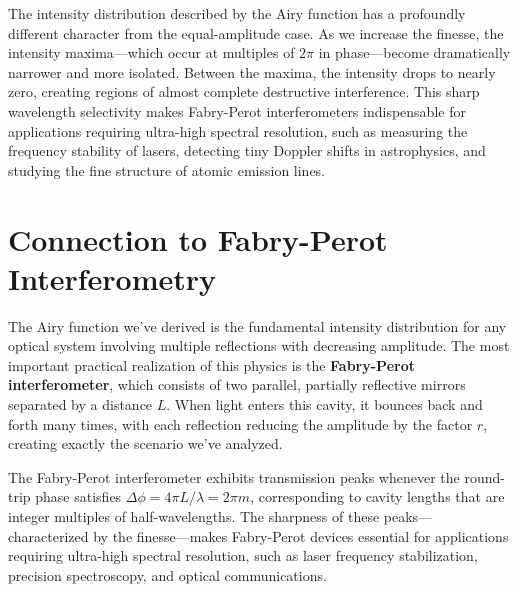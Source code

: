 \documentclass[
  a4paper,
]{book}
\begin{document}
The intensity distribution described by the Airy function has a
profoundly different character from the equal-amplitude case. As we
increase the finesse, the intensity maxima---which occur at multiples of
\(2\pi\) in phase---become dramatically narrower and more isolated.
Between the maxima, the intensity drops to nearly zero, creating regions
of almost complete destructive interference. This sharp wavelength
selectivity makes Fabry-Perot interferometers indispensable for
applications requiring ultra-high spectral resolution, such as measuring
the frequency stability of lasers, detecting tiny Doppler shifts in
astrophysics, and studying the fine structure of atomic emission lines.

\section{Connection to Fabry-Perot
Interferometry}\label{connection-to-fabry-perot-interferometry}

The Airy function we've derived is the fundamental intensity
distribution for any optical system involving multiple reflections with
decreasing amplitude. The most important practical realization of this
physics is the \textbf{Fabry-Perot interferometer}, which consists of
two parallel, partially reflective mirrors separated by a distance
\(L\). When light enters this cavity, it bounces back and forth many
times, with each reflection reducing the amplitude by the factor \(r\),
creating exactly the scenario we've analyzed.

The Fabry-Perot interferometer exhibits transmission peaks whenever the
round-trip phase satisfies \(\Delta\phi = 4\pi L/\lambda = 2\pi m\),
corresponding to cavity lengths that are integer multiples of
half-wavelengths. The sharpness of these peaks---characterized by the
finesse---makes Fabry-Perot devices essential for applications requiring
ultra-high spectral resolution, such as laser frequency stabilization,
precision spectroscopy, and optical communications.
\end{document}
